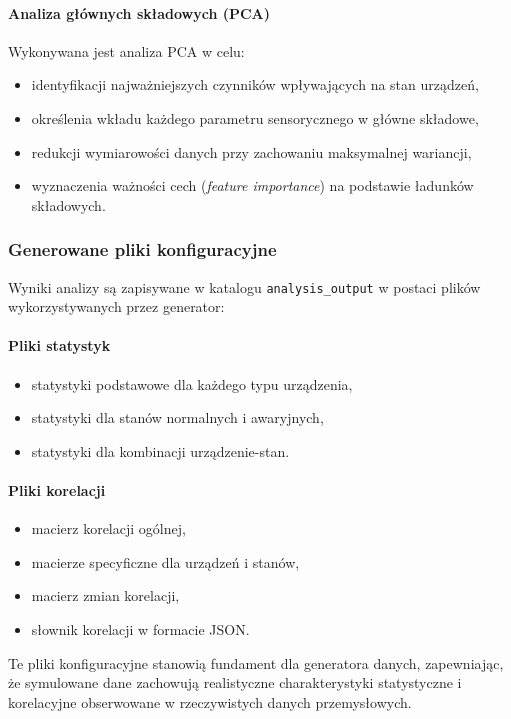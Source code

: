 \paragraph{Analiza głównych składowych (PCA)}
Wykonywana jest analiza PCA w celu:
\begin{itemize}
    \item identyfikacji najważniejszych czynników wpływających na stan urządzeń,
    \item określenia wkładu każdego parametru sensorycznego w główne składowe,
    \item redukcji wymiarowości danych przy zachowaniu maksymalnej wariancji,
    \item wyznaczenia ważności cech (\textit{feature importance}) na podstawie ładunków składowych.
\end{itemize}

\subsubsection{Generowane pliki konfiguracyjne}

Wyniki analizy są zapisywane w katalogu \texttt{analysis\_output} w postaci plików wykorzystywanych przez generator:

\paragraph{Pliki statystyk}
\begin{itemize}
    \item statystyki podstawowe dla każdego typu urządzenia,
    \item statystyki dla stanów normalnych i awaryjnych,
    \item statystyki dla kombinacji urządzenie-stan.
\end{itemize}

\paragraph{Pliki korelacji}
\begin{itemize}
    \item macierz korelacji ogólnej,
    \item macierze specyficzne dla urządzeń i stanów,
    \item macierz zmian korelacji,
    \item słownik korelacji w formacie JSON.
\end{itemize}

Te pliki konfiguracyjne stanowią fundament dla generatora danych, zapewniając, że symulowane dane zachowują realistyczne charakterystyki statystyczne i korelacyjne obserwowane w rzeczywistych danych przemysłowych.

